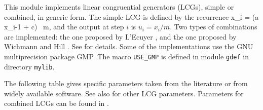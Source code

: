 
This module implements linear congruential generators (LCGs),
simple or combined, in generic form.
The simple LCG is defined by the recurrence
\eq
  x_i = (a x_{i-1} + c) \ \mod m,                    \label {lcg}
\endeq
and the output at step $i$ is $u_i = x_i / m$.
Two types of combinations are implemented:
%
the one proposed by L'Ecuyer \cite{rLEC88a}, and the one proposed
by Wichmann and Hill \cite{rWIC82a}.
See \cite{rLEC91b} for details.
Some of the implementations use the GNU multiprecision package GMP.
The macro {\tt USE\_GMP} is defined in module {\tt gdef} in directory
{\tt mylib}.

The following table gives specific parameters taken from
the literature or from widely available software.
See also \cite{sFIS96a,rLEC99c} for other LCG parameters.
Parameters for combined LCGs can be found in
\cite{rLEC88a,rLEC91b,rLEC97d}.


